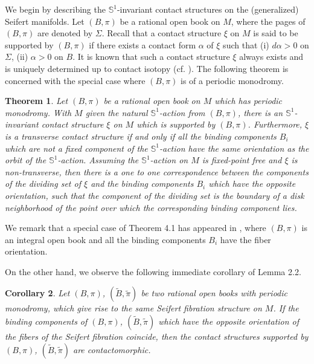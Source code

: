 \documentclass[11pt]{amsart}
\theoremstyle{plain}
\newtheorem{theorem}{Theorem}
\numberwithin{theorem}{section}
\newtheorem{corollary}[theorem]{Corollary}
\theoremstyle{definition}
\newcommand{\s}{{\mathbb S}}
\begin{document}
We begin by describing the $\s^1$-invariant contact structures on the (generalized) Seifert manifolds. 
Let $(B,\pi)$ be a rational open book on $M$, where the pages of $(B,\pi)$ are denoted by $\Sigma$.
Recall that a contact structure $\xi$ on $M$ is said to be supported by $(B,\pi)$ if there exists a contact form $\alpha$ of $\xi$ such that (i) $d\alpha>0$ on $\Sigma$, (ii) $\alpha>0$ on $B$. It is known that such a contact structure $\xi$ always exists and is uniquely determined up to contact isotopy (cf. \cite{BEV}). The following theorem is concerned with the special case where $(B,\pi)$ is of a periodic monodromy. 


\begin{theorem}
Let $(B,\pi)$ be a rational open book on $M$ which has periodic monodromy. With $M$ given the natural $\s^1$-action from $(B,\pi)$, there is an $\s^1$-invariant contact structure $\xi$ on $M$ which
is supported by $(B,\pi)$. Furthermore, $\xi$ is a transverse contact structure if and only if all the binding components $B_i$ which are not a fixed component of the $\s^1$-action have the same orientation as the orbit of the $\s^1$-action. Assuming the $\s^1$-action on $M$ is fixed-point free and $\xi$ is non-transverse, then there is a one to one correspondence between the components of the dividing set of $\xi$ and the binding components $B_i$ which have the opposite orientation, such that the component of the dividing set is the boundary of a disk neighborhood of the point over which the corresponding binding component lies. 
\end{theorem}

We remark that a special case of Theorem 4.1 has appeared in \cite{CH}, 
where $(B,\pi)$ is an integral open book and all the binding components $B_i$ have the fiber
orientation. 

On the other hand, we observe the following immediate corollary of Lemma 2.2.

\begin{corollary}
Let $(B,\pi)$, $(\tilde{B},\tilde{\pi})$ be two rational open books with periodic monodromy, which give rise to the same Seifert fibration structure on $M$. If the binding components of $(B,\pi)$, 
$(\tilde{B},\tilde{\pi})$ which have the opposite orientation of the fibers of the Seifert fibration coincide,
then the contact structures supported by $(B,\pi)$, $(\tilde{B},\tilde{\pi})$ are contactomorphic. 
\end{corollary} 

\vspace{2mm}
\end{document}

